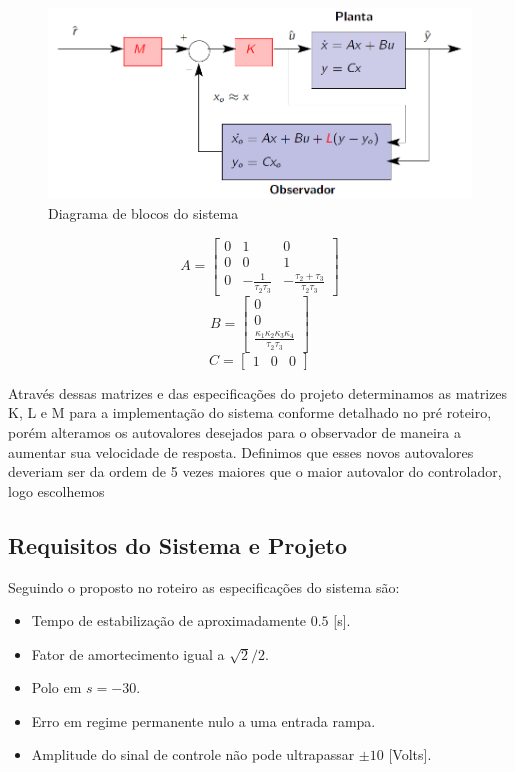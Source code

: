 \documentclass{article}
\begin{document}
\begin{figure}[H]
	\centering
	\includegraphics[width=0.8\linewidth]{contrss}
	\caption{Diagrama de blocos do sistema}
	\label{fig:contrss}
\end{figure}

\begin{equation}
\label{eq:mata}
A=
\begin{bmatrix}
 0 & 1 & 0 \\
 0 & 0 & 1 \\
 0 & -\frac{1}{\tau_2\tau_3} & -\frac{\tau_2+\tau_3}{\tau_2\tau_3}
\end{bmatrix}
\end{equation}
\begin{equation}
\label{eq:matb}
B=
\begin{bmatrix}
0 \\
0 \\
\frac{\kappa_1\kappa_2\kappa_3\kappa_4}{\tau_2\tau_3}
\end{bmatrix}
\end{equation}
\begin{equation}
\label{eq:matc}
C=
\begin{bmatrix}
1 & 0 & 0
\end{bmatrix}
\end{equation}

Através dessas matrizes e das especificações do projeto determinamos as matrizes K, L e M para a implementação do sistema conforme detalhado no pré roteiro, porém alteramos os autovalores desejados para o observador de maneira a aumentar sua velocidade de resposta. Definimos que esses novos autovalores deveriam ser da ordem de 5 vezes maiores que o maior autovalor do controlador, logo escolhemos 
\subsection{Requisitos do Sistema e Projeto}
Seguindo o proposto no roteiro \cite{bb:roteiro} as especificações do sistema são:
\begin{itemize}
	\item Tempo de estabilização de aproximadamente $0.5$ [s].
	\item Fator de amortecimento igual a $\sqrt{2}/2$.
	\item Polo em $s=-30$.
	\item Erro em regime permanente nulo a uma entrada rampa.
	\item Amplitude do sinal de controle não pode ultrapassar $\pm10$ [Volts].
\end{itemize}\
\end{document}
